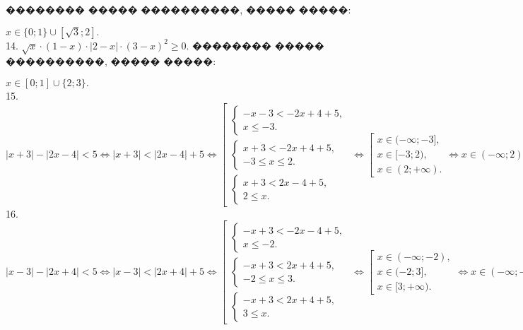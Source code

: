 \documentclass[12pt]{article}
\begin{document}
�������� ����� ����������, ����� �����:
\begin{figure}[ht!]
\end{figure}
$x\in\{0; 1\}\cup[\sqrt{3};2].$\\
14. $\sqrt{x}\cdot(1-x)\cdot|2-x|\cdot(3-x)^2\geqslant0.$
�������� ����� ����������, ����� �����:
\begin{figure}[ht!]
\end{figure}
$x\in[0;1]\cup\{2; 3\}.$\\
15. $|x+3|-|2x-4|<5\Leftrightarrow |x+3|<|2x-4|+5 \Leftrightarrow \left[\begin{array}{l}\begin{cases} -x-3<-2x+4+5,\\ x\leqslant -3.\end{cases}\\
\begin{cases} x+3<-2x+4+5,\\ -3\leqslant x\leqslant 2 .\end{cases}\\\begin{cases} x+3<2x-4+5,\\ 2\leqslant x.\end{cases}\end{array}\right.\Leftrightarrow
\left[\begin{array}{l}
x\in(-\infty;-3],\\
x\in[-3;2),\\
x\in(2;+\infty).\end{array}\right.\Leftrightarrow x\in(-\infty;2)\cup(2;+\infty)$\\
16. $|x-3|-|2x+4|<5\Leftrightarrow |x-3|<|2x+4|+5 \Leftrightarrow \left[\begin{array}{l}\begin{cases} -x+3<-2x-4+5,\\ x\leqslant -2.\end{cases}\\
\begin{cases} -x+3<2x+4+5,\\ -2\leqslant x\leqslant 3 .\end{cases}\\\begin{cases} -x+3<2x+4+5,\\ 3\leqslant x.\end{cases}\end{array}\right.\Leftrightarrow
\left[\begin{array}{l}
x\in(-\infty;-2),\\
x\in(-2;3],\\
x\in[3;+\infty).\end{array}\right.\Leftrightarrow x\in(-\infty;-2)\cup(-2;+\infty)$\\
\end{document}
